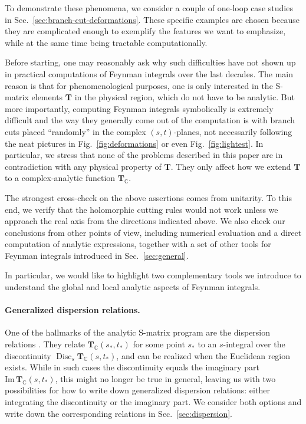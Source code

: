 \documentclass[12pt]{article}
\numberwithin{figure}{section}
\DeclareMathOperator{\Disc}{Disc}
\def \C {\mathbb{C}}
\def \Im {\mathrm{Im}}
\def \T {\mathbf{T}}
\begin{document}
	To demonstrate these phenomena, we consider a couple of one-loop case studies in Sec.~\ref{sec:branch-cut-deformations}.
	These specific examples are chosen because they are complicated enough to exemplify the features we want to emphasize, while at the same time being tractable computationally.
	
	Before starting, one may reasonably ask why such difficulties have not shown up in practical computations of Feynman integrals over the last decades. The main reason is that for phenomenological purposes, one is only interested in the S-matrix elements $\T$ in the physical region, which do not have to be analytic. But more importantly, computing Feynman integrals symbolically is extremely difficult and the way they generally come out of the computation is with branch cuts placed ``randomly'' in the complex $(s,t)$-planes, not necessarily following the neat pictures in Fig.~\ref{fig:deformations} or even Fig.~\ref{fig:lightest}.
	In particular, we stress that none of the problems described in this paper are in contradiction with any physical property of $\T$. They only affect how we extend $\T$ to a complex-analytic function $\T_\C$.
	
	The strongest cross-check on the above assertions comes from unitarity. To this end, we verify that the holomorphic cutting rules would not work unless we approach the real axis from the directions indicated above.
	We also check our conclusions from other points of view, including numerical evaluation and a direct computation of analytic expressions, together with a set of other tools for Feynman integrals introduced in Sec.~\ref{sec:general}.
	
	In particular, we would like to highlight two complementary tools we introduce to understand the global and local analytic aspects of Feynman integrals.
	
	\paragraph{Generalized dispersion relations.} 
	One of the hallmarks of the analytic S-matrix program are the dispersion relations \cite{GellMann:1954db,Mandelstam_1962}. They relate $\T_\C(s_\ast,t_\ast)$ for some point $s_\ast$ to an $s$-integral over the discontinuity $\Disc_s \T_\C(s,t_\ast)$, and can be realized when the Euclidean region exists. While in such cases the discontinuity equals the imaginary part $\Im\, \T_\C(s,t_\ast)$, this might no longer be true in general, leaving us with two possibilities for how to write down generalized dispersion relations: either integrating the discontinuity or the imaginary part. We consider both options and write down the corresponding relations in  Sec.~\ref{sec:dispersion}.
	
\end{document}
